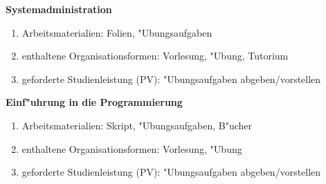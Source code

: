 \documentclass[10pt, oneside]{article}
\begin{document}
\vspace{10pt}

\begin{multicols}{2}

\textbf{Systemadministration}

\begin{enumerate}[-]
    \item Arbeitsmaterialien: Folien, "Ubungsaufgaben
    \item enthaltene Organisationsformen: Vorlesung, "Ubung, Tutorium
    \item geforderte Studienleistung (PV): "Ubungsaufgaben abgeben/vorstellen
\end{enumerate}

\columnbreak

\textbf{Einf"uhrung in die Programmierung}

\begin{enumerate}[-]
    \item Arbeitsmaterialien: Skript, "Ubungsaufgaben, B"ucher
    \item enthaltene Organisationsformen: Vorlesung, "Ubung
    \item geforderte Studienleistung (PV): "Ubungsaufgaben abgeben/vorstellen
\end{enumerate}

\end{multicols}
\end{document}
